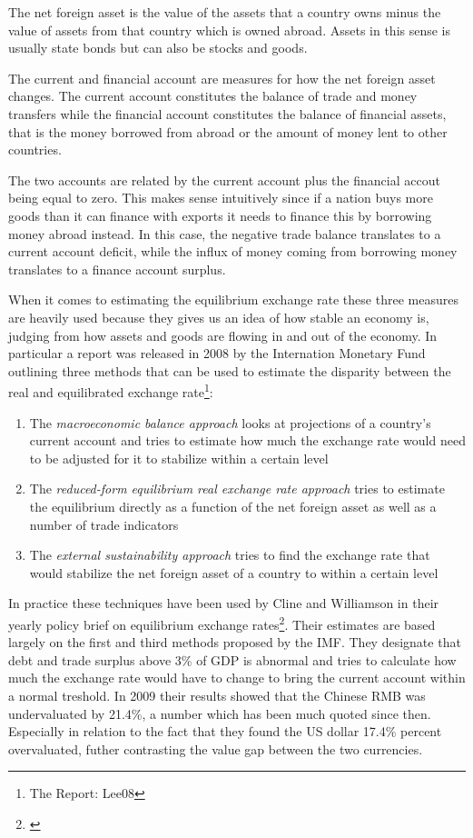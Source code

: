 The net foreign asset is the value of the assets that a country owns 
minus the value of assets from that country which is owned abroad.  
Assets in this sense is usually state bonds but can also be stocks and 
goods.  

The current and financial account are measures for how the net foreign asset changes.  
The current account constitutes the balance of trade and money transfers 
while the financial account constitutes the balance of financial assets, 
that is the money borrowed from abroad or the amount of money lent to 
other countries. 

The two accounts are related by the current account plus the financial 
accout being equal to zero. This makes sense intuitively since if a 
nation buys more goods than it can finance with exports it needs to 
finance this by borrowing money abroad instead. In this case, the 
negative trade balance translates to a current account deficit, while 
the influx of money coming from borrowing money translates to a finance 
account surplus.

When it comes to estimating the equilibrium exchange rate these three 
measures are heavily used because they gives us an idea of how stable an 
economy is, judging from how assets and goods are flowing in and out of 
the economy. In particular a report was released in 2008 by the 
Internation Monetary Fund outlining three methods that can be used to 
estimate the disparity between the real and equilibrated exchange 
rate\footnote{The Report: \cite{pp.  1}{Lee08}}:

\begin{enumerate}
	\item{The \emph{macroeconomic balance approach} looks at projections 
		of a country's current account and tries to estimate how much 
	the exchange rate would need to be adjusted for it to stabilize 
within a certain level}
\item{The \emph{reduced-form equilibrium real exchange rate approach} 
	tries to estimate the equilibrium directly as a function of the net 
foreign asset as well as a number of trade indicators}
\item{The \emph{external sustainability approach} tries to find the 
	exchange rate that would stabilize the net foreign asset of a 
country to within a certain level}
\end{enumerate}

In practice these techniques have been used by Cline and Williamson in 
their yearly policy brief on equilibrium exchange 
rates\footnote{\cite{cline2009,cline2012}}.  Their estimates are based 
largely on the first and third methods proposed by the IMF. They 
designate that debt and trade surplus above 3\% of GDP is abnormal and 
tries to calculate how much the exchange rate would have to change to 
bring the current account within a normal treshold. In 2009 their 
results showed that the Chinese RMB was undervaluated by 21.4\%, a 
number which has been much quoted since then. Especially in relation to 
the fact that they found the US dollar 17.4\% percent overvaluated, 
futher contrasting the value gap between the two currencies.

